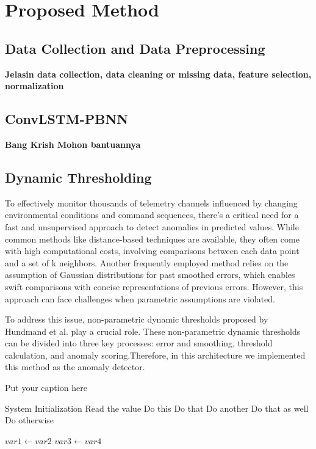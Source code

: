 \documentclass[final,3p,times,twocolumn]{elsarticle}
\begin{document}
\section{Proposed Method}\label{sec2}

\subsection{Data Collection and Data Preprocessing}
\textbf{Jelasin data collection, data cleaning or missing data, feature selection, normalization}

\subsection{ConvLSTM-PBNN}
\textbf{Bang Krish Mohon bantuannya}

\subsection{Dynamic Thresholding}
To effectively monitor thousands of telemetry channels influenced by changing environmental conditions and command sequences, there's a critical need for a fast and unsupervised approach to detect anomalies in predicted values. While common methods like distance-based techniques are available, they often come with high computational costs, involving comparisons between each data point and a set of k neighbors. Another frequently employed method relies on the assumption of Gaussian distributions for past smoothed errors, which enables swift comparisons with concise representations of previous errors. However, this approach can face challenges when parametric assumptions are violated. 

To address this issue, non-parametric dynamic thresholds proposed by Hundmand et al. play a crucial role. These non-parametric dynamic thresholds can be divided into three key processes: error and smoothing, threshold calculation, and anomaly scoring.Therefore, in this architecture we implemented this method as the anomaly detector.

\begin{algorithm}
\caption{Put your caption here}
\begin{algorithmic}[1]

       
    \State System Initialization
    \State Read the value 
        \State Do this
        \State Do that
        \State Do another
        \State Do that as well
        \Else
        \State Do otherwise
        \EndIf
    \EndIf

      
        \State $var1 \leftarrow var2$  
        \State $var3 \leftarrow var4$
    \EndWhile  \label{roy's loop}
\EndProcedure

\end{algorithmic}
\end{algorithm}
\end{document}
